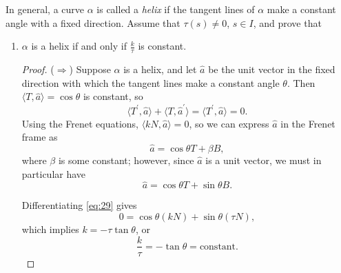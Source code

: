 \documentclass[12pt]{article}
\newenvironment{problem}[2][Problem]{\begin{trivlist}
    \item[\hskip \labelsep {\bfseries #1}\hskip \labelsep {\bfseries #2.}]}{\end{trivlist}}
\theoremstyle{definition}
\begin{document}
\newpage
\begin{problem}{1.5.17}
  In general, a curve \(\alpha\) is called a \textit{helix} if the tangent lines of \(\alpha\) make a constant angle with a fixed direction.
  Assume that \(\tau(s) \neq 0\), \( s \in I \), and prove that
  \begin{enumerate}[label=(\alph*)]
    \item \(\alpha\) is a helix if and only if \( \frac{k}{\tau} \) is constant.
          \begin{proof}
            (\(\Rightarrow\)) Suppose \( \alpha \) is a helix, and let \( \hat{a} \) be the unit vector in the fixed direction with which the tangent lines make a constant angle \(\theta\).
            Then \( \langle T, \hat{a} \rangle = \cos\theta \) is constant, so
            \begin{equation}
            \label{eq:27}
            \langle T^{\prime}, \hat{a} \rangle + \langle T, \hat{a}^{\prime} \rangle = \langle T^{\prime}, \hat{a} \rangle = 0.
            \end{equation}
            Using the Frenet equations,
            \( \langle kN, \hat{a} \rangle = 0 \), so we can express \( \hat{a} \) in the Frenet frame as
            \begin{equation}
            \label{eq:28}
            \hat{a} = \cos\theta T + \beta B,
            \end{equation}
            where \( \beta \) is some constant; however, since \( \hat{a} \) is a unit vector, we must in particular have
            \begin{equation}
            \label{eq:29}
            \hat{a} = \cos\theta T + \sin\theta B.
            \end{equation}

            Differentiating \cref{eq:29} gives
            \begin{equation}
            \label{eq:30}
            0 = \cos\theta (kN) + \sin\theta (\tau N),
            \end{equation}
            which implies \(k = -\tau\tan\theta\), or
            \begin{equation}
            \label{eq:32}
            \frac{k}{\tau} = -\tan\theta = \text{constant}.
            \end{equation}


\end{proof}
\end{enumerate}
\end{problem}
\end{document}
